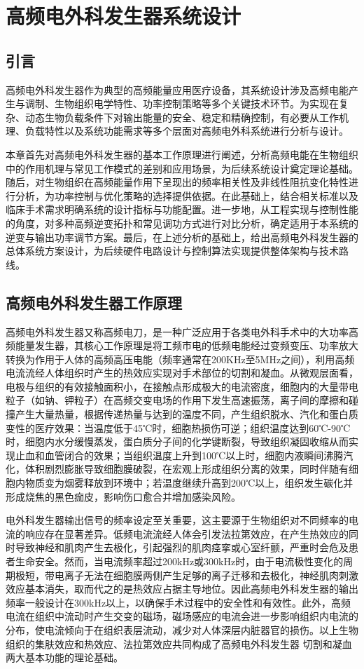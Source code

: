 \chapter{高频电外科发生器系统设计}
%
\section{引言}
高频电外科发生器作为典型的高频能量应用医疗设备，其系统设计涉及高频电能产生与调制、生物组织电学特性、功率控制策略等多个关键技术环节。为实现在复杂、动态生物负载条件下对输出能量的安全、稳定和精确控制，有必要从工作机理、负载特性以及系统功能需求等多个层面对高频电外科系统进行分析与设计。

本章首先对高频电外科发生器的基本工作原理进行阐述，分析高频电能在生物组织中的作用机理与常见工作模式的差别和应用场景，为后续系统设计奠定理论基础。随后，对生物组织在高频能量作用下呈现出的频率相关性及非线性阻抗变化特性进行分析，为功率控制与优化策略的选择提供依据。在此基础上，结合相关标准以及临床手术需求明确系统的设计指标与功能配置。进一步地，从工程实现与控制性能的角度，对多种高频逆变拓扑和常见调功方式进行对比分析，确定适用于本系统的逆变与输出功率调节方案。最后，在上述分析的基础上，给出高频电外科发生器的总体系统方案设计，为后续硬件电路设计与控制算法实现提供整体架构与技术路线。

\section{高频电外科发生器工作原理}
高频电外科发生器又称高频电刀，是一种广泛应用于各类电外科手术中的大功率高频能量发生器，其核心工作原理是将工频市电的低频电能经过变频变压、功率放大转换为作用于人体的高频高压电能（频率通常在200KHz至5MHz之间），利用高频电流流经人体组织时产生的热效应实现对手术部位的切割和凝血。从微观层面看，电极与组织的有效接触面积小，在接触点形成极大的电流密度，细胞内的大量带电粒子（如钠、钾粒子）在高频交变电场的作用下发生高速振荡，离子间的摩擦和碰撞产生大量热量，根据传递热量与达到的温度不同，产生组织脱水、汽化和蛋白质变性的医疗效果：当温度低于45℃时，细胞热损伤可逆；组织温度达到60℃-90℃时，细胞内水分缓慢蒸发，蛋白质分子间的化学键断裂，导致组织凝固收缩从而实现止血和血管闭合的效果；当组织温度上升到100℃以上时，细胞内液瞬间沸腾汽化，体积剧烈膨胀导致细胞膜破裂，在宏观上形成组织分离的效果，同时伴随有细胞内物质变为烟雾释放到环境中；若温度继续升高到200℃以上，组织发生碳化并形成烧焦的黑色痂皮，影响伤口愈合并增加感染风险。

电外科发生器输出信号的频率设定至关重要，这主要源于生物组织对不同频率的电流的响应存在显著差异。低频电流流经人体会引发法拉第效应，在产生热效应的同时导致神经和肌肉产生去极化，引起强烈的肌肉痉挛或心室纤颤，严重时会危及患者生命安全。然而，当电流频率超过200kHz或300kHz时，由于电流极性变化的周期极短，带电离子无法在细胞膜两侧产生足够的离子迁移和去极化，神经肌肉刺激效应基本消失，取而代之的是热效应占据主导地位。因此高频电外科发生器的输出频率一般设计在300kHz以上，以确保手术过程中的安全性和有效性。此外，高频电流在组织中流动时产生交变的磁场，磁场感应的电流会进一步影响组织内电流的分布，使电流倾向于在组织表层流动，减少对人体深层内脏器官的损伤。以上生物组织的集肤效应和热效应、法拉第效应共同构成了高频电外科发生器
切割和凝血两大基本功能的理论基础。

